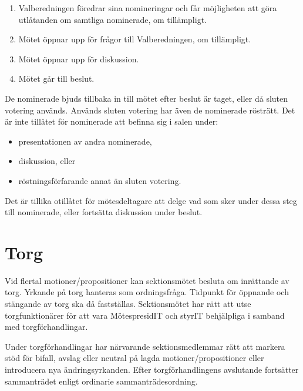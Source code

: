 \documentclass[11pt, includeaddress]{classes/cthit}
\begin{document}
\begin{enumerate}
    \item Valberedningen föredrar sina nomineringar och får möjligheten att göra utlåtanden om samtliga nominerade, om tillämpligt.
    \item Mötet öppnar upp för frågor till Valberedningen, om tillämpligt.
    \item Mötet öppnar upp för diskussion.
    \item Mötet går till beslut.
\end{enumerate}
De nominerade bjuds tillbaka in till mötet efter beslut är taget, eller då sluten votering används. Används sluten votering har även de nominerade rösträtt. Det är inte tillåtet för nominerade att befinna sig i salen under:
\begin{itemize}
    \item presentationen av andra nominerade,
    \item diskussion, eller
    \item röstningsförfarande annat än sluten votering.
\end{itemize}
Det är tillika otillåtet för mötesdeltagare att delge vad som sker under dessa steg till nominerade, eller fortsätta diskussion under beslut.

\section{Torg}
Vid flertal motioner/propositioner kan sektionsmötet besluta om inrättande av torg. Yrkande på torg hanteras som ordningsfråga. Tidpunkt för öppnande och stängande av torg ska då fastställas. Sektionsmötet har rätt att utse torgfunktionärer för att vara MötespresidIT och styrIT behjälpliga i samband med torgförhandlingar.

Under torgförhandlingar har närvarande sektionsmedlemmar rätt att markera stöd för bifall, avslag eller neutral på lagda motioner/propositioner eller introducera nya ändringsyrkanden. Efter torgförhandlingens avslutande fortsätter sammanträdet enligt ordinarie sammanträdesordning.
\end{document}
